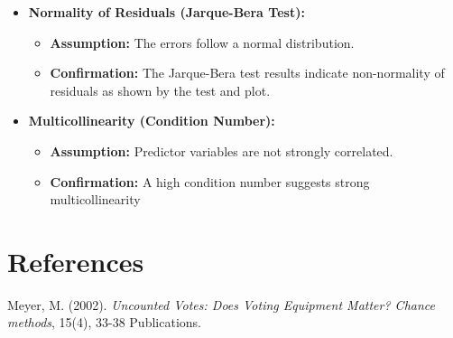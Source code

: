 \documentclass[fleqn,a4paper,12pt]{article}
\begin{document}
\begin{itemize}
\item \textbf{Normality of Residuals (Jarque-Bera Test):}
   \begin{itemize}
   \item \textbf{Assumption:} The errors follow a normal distribution.
   \item \textbf{Confirmation:} The Jarque-Bera test results indicate non-normality of residuals as shown by the test and plot.
   \end{itemize}

\item \textbf{Multicollinearity (Condition Number):}
   \begin{itemize}
   \item \textbf{Assumption:} Predictor variables are not strongly correlated.
   \item \textbf{Confirmation:} A high condition number suggests strong multicollinearity
\end{itemize}
\end{itemize}

\newpage

\section{References}
  \leftskip 0.1in
  \parindent -0.1in
  Meyer, M. (2002). \textit{Uncounted Votes: Does Voting Equipment Matter? Chance methods}, 15(4), 33-38 Publications.
 
\end{document}
